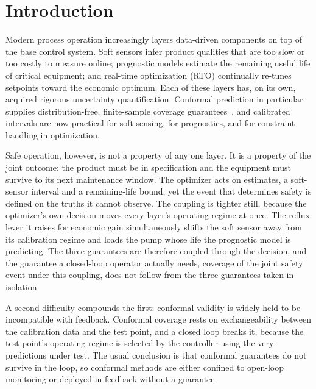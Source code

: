 \documentclass[review,12pt]{elsarticle}
\theoremstyle{definition}
\begin{document}
\section{Introduction}
\label{sec:intro}

Modern process operation increasingly layers data-driven components on top of the base
control system. Soft sensors infer product qualities that are too slow or too costly to
measure online; prognostic models estimate the remaining useful life of critical
equipment; and real-time optimization (RTO) continually re-tunes setpoints toward the
economic optimum. Each of these layers has, on its own, acquired rigorous uncertainty
quantification. Conformal prediction in particular supplies distribution-free,
finite-sample coverage guarantees~\citep{vovk2005,shafer2008,angelopoulos2023}, and
calibrated intervals are now practical for soft sensing, for prognostics, and for
constraint handling in optimization.

Safe operation, however, is not a property of any one layer. It is a property of the
joint outcome: the product must be in specification and the equipment must survive to its
next maintenance window. The optimizer acts on estimates, a soft-sensor interval and a
remaining-life bound, yet the event that determines safety is defined on the truths it
cannot observe. The coupling is tighter still, because the optimizer's own decision moves
every layer's operating regime at once. The reflux lever it raises for economic gain
simultaneously shifts the soft sensor away from its calibration regime and loads the pump
whose life the prognostic model is predicting. The three guarantees are therefore coupled
through the decision, and the guarantee a closed-loop operator actually needs, coverage of
the joint safety event under this coupling, does not follow from the three guarantees
taken in isolation.

A second difficulty compounds the first: conformal validity is widely held to be
incompatible with feedback. Conformal coverage rests on exchangeability between the
calibration data and the test point, and a closed loop breaks it, because the test point's
operating regime is selected by the controller using the very predictions under test. The
usual conclusion is that conformal guarantees do not survive in the loop, so conformal
methods are either confined to open-loop monitoring or deployed in feedback without a
guarantee.
\end{document}

